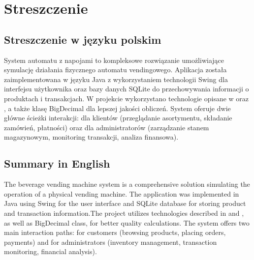 \section{Streszczenie}
\subsection{Streszczenie w języku polskim}
System automatu z napojami to kompleksowe rozwiązanie umożliwiające symulację działania fizycznego automatu vendingowego. Aplikacja została zaimplementowana w języku Java z wykorzystaniem technologii Swing dla interfejsu użytkownika oraz bazy danych SQLite do przechowywania informacji o produktach i transakcjach. W projekcie wykorzystano technologie opisane w \cite{oracle_java} oraz \cite{sqlite_doc}, a także klasę BigDecimal\cite{BigDecimal} dla lepszej jakości obliczeń. System oferuje dwie główne ścieżki interakcji: dla klientów (przeglądanie asortymentu, składanie zamówień, płatności) oraz dla administratorów (zarządzanie stanem magazynowym, monitoring transakcji, analiza finansowa).

\subsection{Summary in English}
The beverage vending machine system is a comprehensive solution simulating the operation of a physical vending machine. The application was implemented in Java using Swing for the user interface and SQLite database for storing product and transaction information.The project utilizes technologies described in \cite{oracle_java} and \cite{sqlite_doc}, as well as BigDecimal class\cite{BigDecimal}, for better quality calculations. The system offers two main interaction paths: for customers (browsing products, placing orders, payments) and for administrators (inventory management, transaction monitoring, financial analysis).